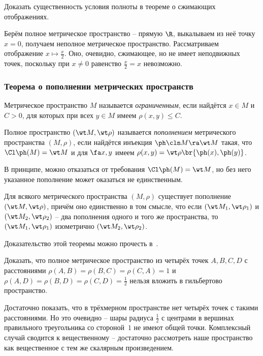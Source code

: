 \documentclass[a4paper]{article}
\begin{document}
\begin{problem}
Доказать существенность условия полноты в теореме о сжимающих отображениях.
\end{problem}
\begin{solution}
Берём полное метрическое пространство -- прямую $\R$, выкалываем из неё точку $x = 0$,
получаем неполное метрическое пространство.
Рассматриваем отображение $x \mapsto \frac x2$. Оно, очевидно, сжимающее,
но не имеет неподвижных точек, поскольку при $x \neq 0$ равенство $\frac x 2 = x$ невозможно.
\end{solution}

\subsubsection{Теорема о пополнении метрических пространств}

\begin{df}
Метрическое пространство $M$ называется \emph{ограниченным}, если найдётся $x \in M$ и $C > 0$, для которых
при всех $y \in M$ имеем $\rho(x,y) \le C$.
\end{df}

\begin{df}
Полное пространство $(\wt M, \wt \rho)$ называется \emph{пополнением} метрического пространства $(M, \rho)$,
если найдётся инъекция $\ph\cln M \ra \wt M$ такая, что $\Cl \ph(M) = \wt M$ и для $\fa x,y$ имеем
$\rho(x,y) = \wt\rho\br{\ph(x), \ph(y)}$.
\end{df}

\begin{note}
В принципе, можно отказаться от требования $\Cl \ph(M) = \wt M$,
но без него указанное пополнение может оказаться не единственным.
\end{note}

\begin{theorem}
Для всякого метрического пространства $(M, \rho)$ существует
пополнение $(\wt M, \wt \rho)$, причём оно единственно в том смысле,
что если $(\wt M_1, \wt\rho_1)$ и $(\wt M_2, \wt\rho_2)$ -- два пополнения одного и того
же пространства, то $(\wt M_1, \wt\rho_1)$ изометрично $(\wt M_2, \wt\rho_2)$.
\end{theorem}

Доказательство этой теоремы можно прочесть в~\cite[гл.~II, \S~3, п.~4]{kf}.

\begin{problem}
Доказать, что полное метрическое пространство из четырёх точек $A, B, C, D$ с расстояниями
$\rho(A,B) = \rho(B, C) = \rho(C,A) = 1$ и $\rho(A, D) = \rho(B, D) = \rho(C, D) = \frac12$
нельзя вложить в гильбертово пространство.
\end{problem}
\begin{solution}
Достаточно показать, что в трёхмерном пространстве нет четырёх точек с такими расстояниями.
Но это очевидно -- шары радиуса $\frac12$ с центрами в вершинах правильного треугольника со стороной~$1$
не имеют общей точки. Комплексный случай сводится к вещественному -- достаточно рассмотреть
наше пространство как вещественное с тем же скалярным произведением.
\end{solution}
\end{document}
